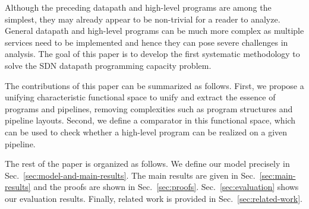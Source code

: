 Although the preceding datapath and high-level programs are among the simplest, they may already appear to be non-trivial for a reader to analyze. General datapath and high-level programs can be much more complex as multiple services need to be implemented and hence they can pose severe challenges in analysis. The goal of this paper is to develop the first systematic methodology to solve the SDN datapath programming capacity problem. 

The contributions of this paper can be summarized as follows. First, we  propose a unifying characteristic functional space to unify and extract the essence of programs and pipelines, removing complexities such as program structures and pipeline layouts. Second, we define a comparator in this functional space, which can be used to check whether a high-level program can be realized on a given pipeline.

The rest of the paper is organized as follows. We define our model precisely in Sec.~\ref{sec:model-and-main-results}. The main results are given in Sec.~\ref{sec:main-results} and the proofs are shown in Sec.~\ref{sec:proofs}. Sec.~\ref{sec:evaluation} shows our evaluation results. Finally, related work is provided in Sec.~\ref{sec:related-work}.
